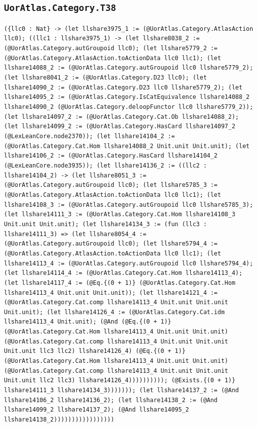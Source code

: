 \documentclass[11pt]{article}
\begin{document}
\subsection*{\texttt{UorAtlas.Category.T38}}
\noindent\texttt{(\{llc0 : Nat\} -> (let llshare3975\_1 := (@UorAtlas.Category.AtlasAction llc0); ((llc1 : llshare3975\_1) -> (let llshare8038\_2 := (@UorAtlas.Category.autGroupoid llc0); (let llshare5779\_2 := (@UorAtlas.Category.AtlasAction.toActionData llc0 llc1); (let llshare14088\_2 := (@UorAtlas.Category.autGroupoid llc0 llshare5779\_2); (let llshare8041\_2 := (@UorAtlas.Category.D23 llc0); (let llshare14090\_2 := (@UorAtlas.Category.D23 llc0 llshare5779\_2); (let llshare14095\_2 := (@UorAtlas.Category.IsCatEquivalence llshare14088\_2 llshare14090\_2 (@UorAtlas.Category.deloopFunctor llc0 llshare5779\_2)); (let llshare14097\_2 := (@UorAtlas.Category.Cat.Ob llshare14088\_2); (let llshare14099\_2 := (@UorAtlas.Category.HasCard llshare14097\_2 (@LexLeanCore.node2370)); (let llshare14104\_2 := (@UorAtlas.Category.Cat.Hom llshare14088\_2 Unit.unit Unit.unit); (let llshare14106\_2 := (@UorAtlas.Category.HasCard llshare14104\_2 (@LexLeanCore.node3935)); (let llshare14136\_2 := ((llc2 : llshare14104\_2) -> (let llshare8051\_3 := (@UorAtlas.Category.autGroupoid llc0); (let llshare5785\_3 := (@UorAtlas.Category.AtlasAction.toActionData llc0 llc1); (let llshare14108\_3 := (@UorAtlas.Category.autGroupoid llc0 llshare5785\_3); (let llshare14111\_3 := (@UorAtlas.Category.Cat.Hom llshare14108\_3 Unit.unit Unit.unit); (let llshare14134\_3 := (fun (llc3 : llshare14111\_3) => (let llshare8054\_4 := (@UorAtlas.Category.autGroupoid llc0); (let llshare5794\_4 := (@UorAtlas.Category.AtlasAction.toActionData llc0 llc1); (let llshare14113\_4 := (@UorAtlas.Category.autGroupoid llc0 llshare5794\_4); (let llshare14114\_4 := (@UorAtlas.Category.Cat.Hom llshare14113\_4); (let llshare14117\_4 := (@Eq.\{(0 + 1)\} (@UorAtlas.Category.Cat.Hom llshare14113\_4 Unit.unit Unit.unit)); (let llshare14121\_4 := (@UorAtlas.Category.Cat.comp llshare14113\_4 Unit.unit Unit.unit Unit.unit); (let llshare14126\_4 := (@UorAtlas.Category.Cat.idm llshare14113\_4 Unit.unit); (@And (@Eq.\{(0 + 1)\} (@UorAtlas.Category.Cat.Hom llshare14113\_4 Unit.unit Unit.unit) (@UorAtlas.Category.Cat.comp llshare14113\_4 Unit.unit Unit.unit Unit.unit llc3 llc2) llshare14126\_4) (@Eq.\{(0 + 1)\} (@UorAtlas.Category.Cat.Hom llshare14113\_4 Unit.unit Unit.unit) (@UorAtlas.Category.Cat.comp llshare14113\_4 Unit.unit Unit.unit Unit.unit llc2 llc3) llshare14126\_4)))))))))); (@Exists.\{(0 + 1)\} llshare14111\_3 llshare14134\_3))))))); (let llshare14137\_2 := (@And llshare14106\_2 llshare14136\_2); (let llshare14138\_2 := (@And llshare14099\_2 llshare14137\_2); (@And llshare14095\_2 llshare14138\_2)))))))))))))))))}\par
\end{document}
